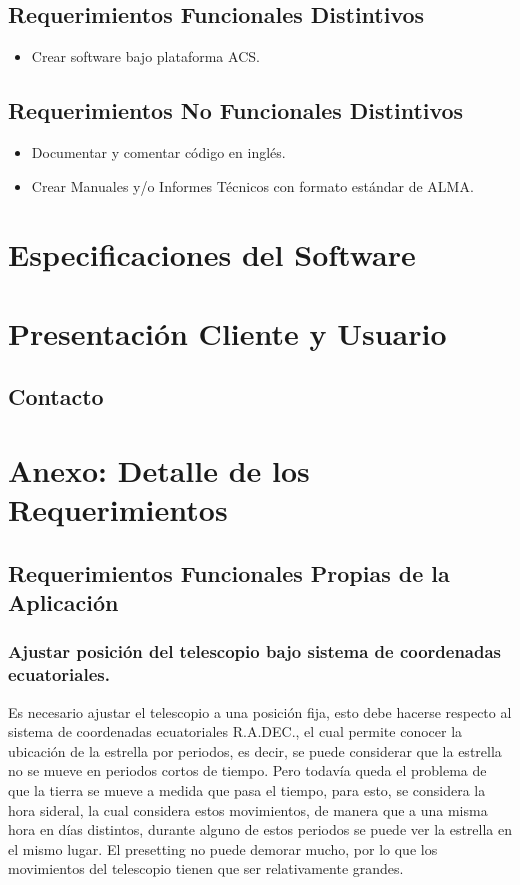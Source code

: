\documentclass[letterpaper,spanish,10pt]{article}
\begin{document}
\subsection{Requerimientos Funcionales Distintivos}
\begin{itemize}
	\item Crear software bajo plataforma ACS.
\end{itemize}


\subsection{Requerimientos No Funcionales Distintivos}
\begin{itemize}
	\item Documentar y comentar c\'odigo en ingl\'es.
	\item Crear Manuales y/o Informes T\'ecnicos con formato est\'andar de ALMA.
\end{itemize}


\newpage


\section{Especificaciones del Software}


\newpage


\section{Presentaci\'on Cliente y Usuario}

\subsection{Contacto}
\newpage


\section{Anexo: Detalle de los Requerimientos}

\subsection{Requerimientos Funcionales Propias de la Aplicaci\'on}

\subsubsection{Ajustar posici\'on del telescopio bajo sistema de coordenadas ecuatoriales.}
Es necesario ajustar el telescopio a una posición fija, esto debe hacerse respecto al sistema de coordenadas ecuatoriales R.A.DEC., el cual permite conocer la ubicación de la estrella por periodos, es decir, se puede considerar que la estrella no se mueve en periodos cortos de tiempo. Pero todavía queda el problema de que la tierra se mueve a medida que pasa el tiempo, para esto, se considera la hora sideral, la cual considera estos movimientos, de manera que a una misma hora en días distintos, durante alguno de estos periodos se puede ver la estrella en el mismo lugar. El presetting no puede demorar mucho, por lo que los movimientos del telescopio tienen que ser relativamente grandes.
\end{document}
